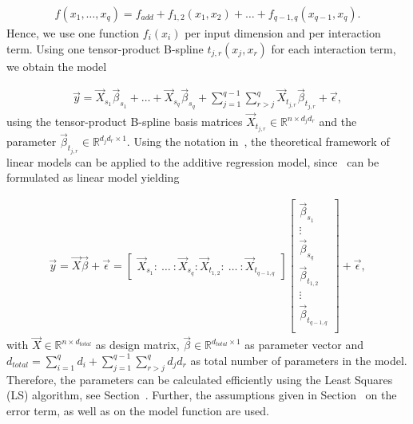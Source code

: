 \begin{align} \label{eq:addRegBaseEquation-with-interaction}
	f(x_1, \dots, x_q) = f_{add} + f_{1,2}(x_1, x_2) + \dots + f_{q-1, q}(x_{q-1},x_q).
\end{align}
%
Hence, we use one function $f_i(x_i)$ per input dimension and per interaction term. Using one tensor-product B-spline $t_{j,r}(x_j, x_r)$ for each interaction term, we obtain the model

\begin{align} \label{eq:STAR}
	\vec{y} = \vec{X}_{s_1} \vec{\beta}_{s_1} + \dots + \vec{X}_{s_q} \vec{\beta}_{s_q} + \sum_{j=1}^{q-1} \sum_{r>j}^{q} \vec{X}_{t_{j, r}} \vec{\beta}_{t_{j, r}} + \vec{\epsilon},
\end{align}
%
using the tensor-product B-spline basis matrices $\vec{X}_{t_{j,r}} \in \mathbb{R}^{n \times d_j d_r}$ and the parameter $\vec{\beta}_{t_{j, r}} \in \mathbb{R}^{d_j d_r \times 1}$. Using the notation in~, the theoretical framework of linear models can be applied to the additive regression model, since~ can be formulated as linear model yielding

\begin{align} \label{eq:STAR-block-diag}
	\vec{y} = \vec{X} \vec{\beta} + \vec{\epsilon} = 
	\begin{bmatrix}
		\vec{X}_{s_1} \colon \ \dots \ \colon \vec{X}_{s_q} \colon \vec{X}_{t_{1,2}} \colon \ \dots  \ \colon \vec{X}_{t_{q-1, q}}    
	\end{bmatrix} \begin{bmatrix} \vec{\beta}_{s_1} \\ 
								  \vdots \\ 
								  \vec{\beta}_{s_q} \\ 
								  \vec{\beta}_{t_{1,2}} \\ 
								  \vdots \\ 
								  \vec{\beta}_{t_{q-1, q}} \\
	\end{bmatrix} + \vec{\epsilon},
\end{align}
%
with $\vec{X} \in \mathbb{R}^{n \times d_{total}}$ as design matrix, $\vec{\beta} \in \mathbb{R}^{d_{total} \times 1}$ as parameter vector and $d_{total} = \sum_{i=1}^q d_i + \sum_{j=1}^{q-1} \sum_{r>j}^q d_j d_r$ as total number of parameters in the model. Therefore, the parameters can be calculated efficiently using the Least Squares (LS) algorithm, see Section~. Further, the assumptions given in Section~ on the error term, as well as on the model function are used.

